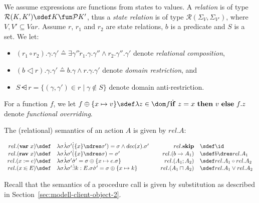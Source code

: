 \documentclass[11pt]{llncs}
\def \nasgn {\mathbin{:\joinrel\in}}
\def \asgn  {{\;:=\;}}
\def \var {{\bf var}\ }
\def \rav {{\bf rav}\ }
\newcommand{\sskip}{\mathbf{skip}}
\newcommand{\mcP}{\mathcal{P}}
\newcommand{\mcR}{\mathcal{R}}
\newcommand{\refsec}[1]{Section~\ref{#1}}
\begin{document}
We assume expressions are functions from states to values.  A
\emph{relation} is of type $\mcR(K, K') \sdef K \fun \mcP K'$, thus a
\emph{state relation} is of type $\mcR (\Sigma_{V}, \Sigma_{V'})$,
where $V, V' \subseteq Var$. Assume $r$, $r_1$ and $r_2$ are state
relations, $b$ is a predicate and $S$ is a set.  We let:
\begin{itemize}
\item $(r_1 \circ r_2).\gamma.\gamma' \sdef \exists \gamma'' \dot
  r_1.\gamma.\gamma'' \land r_2.\gamma''.\gamma'$ 
denote \emph{relational composition},
\item 
$(b \dres r).\gamma.\gamma' \sdef b.\gamma \land r.\gamma.\gamma'$
 denote \emph{domain restriction}, and
\item $S \ndres r = \{(\gamma, \gamma') \in r \mid \gamma \notin
  S\}$ denote domain anti-restriction.
\end{itemize}
For a function $f$, we let
$f \oplus\{x \mapsto v\} \sdef \lambda z \in \dom f \dot {\bf if}\ z =
x\ {\bf then}\ v\ {\bf else}\ f.z$
denote \emph{functional overriding}.
\begin{definition}
  The (relational) semantics of an action $A$ is given by
  $rel.A$:\smallskip

  $\begin{array}[t]{rl@{\qquad}rl}
    rel.(\var x) \sdef & 
    \lambda \sigma \dot \lambda \sigma' \dot (\{x\} \ndres \sigma') =
                         \sigma \land dec(x).\sigma'

    & rel.\sskip & \sdef  \id \\
    rel.(\rav x)  \sdef & \lambda \sigma \dot \lambda \sigma' \dot
    (\{x\} \ndres \sigma) = \sigma'
    & rel.(b \to A_1) & \sdef b \dres rel.A_1 \\
    rel.(x \asgn e)  \sdef & \lambda \sigma \dot \lambda \sigma' \dot
    \sigma' = \sigma \oplus\{x \mapsto e.\sigma\} 
 & rel.(A_1 ;
    A_2) &  \sdef rel.A_1 \circ rel.A_2\\

     rel.(x \nasgn E) \sdef& \lambda \sigma
                             \dot \lambda \sigma' \dot 
    \exists k : E.\sigma \dot \sigma' = \sigma \oplus\{x \mapsto k\}
& rel.(A_1 \sqcap
    A_2) & \sdef rel.A_1 \lor rel.A_2 \\
  \end{array}$
\end{definition}

Recall that the semantics of a procedure call is given by
substitution as described in \refsec{sec:modell-client-object-2}.
\end{document}
